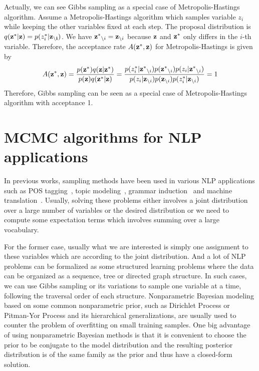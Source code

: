Actually, we can see Gibbs sampling as a special case of Metropolis-Hastings algorithm. Assume a Metropolis-Hastings algorithm which samples variable $z_i$ while keeping
the other variables fixed at each step. 
The proposal distribution is $q({\bf z^*}|{\bf z})=p(z_i^*|{\bf z_{\setminus i}})$. We have ${\bf z^*}_{\setminus i} = {\bf z}_{\setminus i}$ because 
${\bf z}$ and ${\bf z^*}$ only differs in the $i$-th variable. Therefore, the acceptance rate $A({\bf z^*}, {\bf z})$ for Metropolis-Hastings is given by
$$A({\bf z^*}, {\bf z}) = \frac{p({\bf z^*})q({\bf z}|{\bf z^*})}{p({\bf z})q({\bf z^*}|{\bf z})} = \frac{p(z_i^* |{\bf z^*}_{\setminus i})p({\bf z^*}_{\setminus i})p(z_i |{\bf z^*}_{\setminus i})}{p(z_i |{\bf z}_{\setminus i})p({\bf z}_{\setminus i})p(z_i^* |{\bf z}_{\setminus i})}=1$$
Therefore, Gibbs sampling can be seen as a special case of Metropolis-Hastings algorithm with acceptance 1.
\section{MCMC algorithms for NLP applications}
In previous works, sampling methods have been used in various NLP applications such as POS tagging~\cite{finkel2005incorporating}, topic modeling~\cite{wallach2006topic,steyvers2007probabilistic}, grammar induction~\cite{cohn-2009-inducing,PostGildea-acl09} and machine translation~\cite{denero2008sampling}. 
Usually, solving these problems either involves a joint distribution over a large number of variables or the desired distribution
or we need to compute some expectation terms which involves summing over a large vocabulary.


For the former case, usually what we are interested is simply one assignment to these variables which are according to
the joint distribution. And a lot of NLP problems can be formalized as some structured learning problems where the data can
be organized as a sequence, tree or directed graph structure.
In such cases, we can use Gibbs sampling or its variations to sample one variable at a time, following the traversal order of each structure.
Nonparametric Bayesian modeling based on some common nonparametric prior, such as Dirichlet Process or Pitman-Yor Process and its hierarchical generalizations, 
are usually used to counter the problem of overfitting on small training samples.
One big advantage of using nonparametric Bayesian methods is that it is convenient to choose the prior to be conjugate to the model
distribution and the resulting posterior distribution is of the same family as the prior and thus have a closed-form solution.


